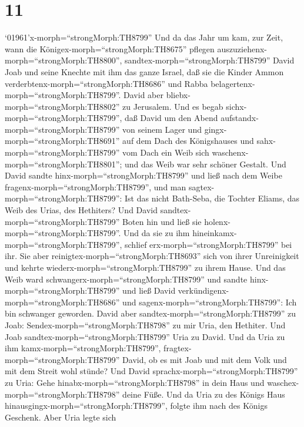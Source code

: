 \hypertarget{section-10}{%
\section{11}\label{section-10}}

 `01961'\textbar x-morph=``strongMorph:TH8799'' Und da das
Jahr um kam, zur Zeit, wann die Königex-morph=``strongMorph:TH8675''
pflegen auszuziehenx-morph=``strongMorph:TH8800'',
sandtex-morph=``strongMorph:TH8799'' David Joab und seine Knechte mit
ihm das ganze Israel, daß sie die Kinder Ammon
verderbtenx-morph=``strongMorph:TH8686'' und Rabba
belagertenx-morph=``strongMorph:TH8799''. David aber
bliebx-morph=``strongMorph:TH8802'' zu Jerusalem.  Und es
begab sichx-morph=``strongMorph:TH8799'', daß David um den Abend
aufstandx-morph=``strongMorph:TH8799'' von seinem Lager und
gingx-morph=``strongMorph:TH8691'' auf dem Dach des Königshauses und
sahx-morph=``strongMorph:TH8799'' vom Dach ein Weib sich
waschenx-morph=``strongMorph:TH8801''; und das Weib war sehr schöner
Gestalt.  Und David sandte hinx-morph=``strongMorph:TH8799''
und ließ nach dem Weibe fragenx-morph=``strongMorph:TH8799'', und man
sagtex-morph=``strongMorph:TH8799'': Ist das nicht Bath-Seba, die
Tochter Eliams, das Weib des Urias, des Hethiters?  Und
David sandtex-morph=``strongMorph:TH8799'' Boten hin und ließ sie
holenx-morph=``strongMorph:TH8799''. Und da sie zu ihm
hineinkamx-morph=``strongMorph:TH8799'', schlief
erx-morph=``strongMorph:TH8799'' bei ihr. Sie aber
reinigtex-morph=``strongMorph:TH8693'' sich von ihrer Unreinigkeit und
kehrte wiederx-morph=``strongMorph:TH8799'' zu ihrem Hause. 
Und das Weib ward schwangerx-morph=``strongMorph:TH8799'' und sandte
hinx-morph=``strongMorph:TH8799'' und ließ David
verkündigenx-morph=``strongMorph:TH8686'' und
sagenx-morph=``strongMorph:TH8799'': Ich bin schwanger geworden.
 David aber sandtex-morph=``strongMorph:TH8799'' zu Joab:
Sendex-morph=``strongMorph:TH8798'' zu mir Uria, den Hethiter. Und Joab
sandtex-morph=``strongMorph:TH8799'' Uria zu David.  Und da
Uria zu ihm kamx-morph=``strongMorph:TH8799'',
fragtex-morph=``strongMorph:TH8799'' David, ob es mit Joab und mit dem
Volk und mit dem Streit wohl stünde?  Und David
sprachx-morph=``strongMorph:TH8799'' zu Uria: Gehe
hinabx-morph=``strongMorph:TH8798'' in dein Haus und
waschex-morph=``strongMorph:TH8798'' deine Füße. Und da Uria zu des
Königs Haus hinausgingx-morph=``strongMorph:TH8799'', folgte ihm nach
des Königs Geschenk.  Aber Uria legte sich
